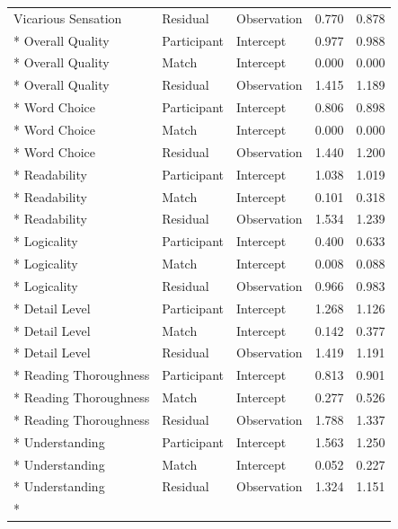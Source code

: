 \begin{longtable}{l l l r r}
Vicarious Sensation & Residual & Observation & 0.770 & 0.878\\*
Overall Quality & Participant & Intercept & 0.977 & 0.988\\*
Overall Quality & Match & Intercept & 0.000 & 0.000\\*
Overall Quality & Residual & Observation & 1.415 & 1.189\\*
Word Choice & Participant & Intercept & 0.806 & 0.898\\*
Word Choice & Match & Intercept & 0.000 & 0.000\\*
Word Choice & Residual & Observation & 1.440 & 1.200\\*
Readability & Participant & Intercept & 1.038 & 1.019\\*
Readability & Match & Intercept & 0.101 & 0.318\\*
Readability & Residual & Observation & 1.534 & 1.239\\*
Logicality & Participant & Intercept & 0.400 & 0.633\\*
Logicality & Match & Intercept & 0.008 & 0.088\\*
Logicality & Residual & Observation & 0.966 & 0.983\\*
Detail Level & Participant & Intercept & 1.268 & 1.126\\*
Detail Level & Match & Intercept & 0.142 & 0.377\\*
Detail Level & Residual & Observation & 1.419 & 1.191\\*
Reading Thoroughness & Participant & Intercept & 0.813 & 0.901\\*
Reading Thoroughness & Match & Intercept & 0.277 & 0.526\\*
Reading Thoroughness & Residual & Observation & 1.788 & 1.337\\*
Understanding & Participant & Intercept & 1.563 & 1.250\\*
Understanding & Match & Intercept & 0.052 & 0.227\\*
Understanding & Residual & Observation & 1.324 & 1.151\\*
\end{longtable}
